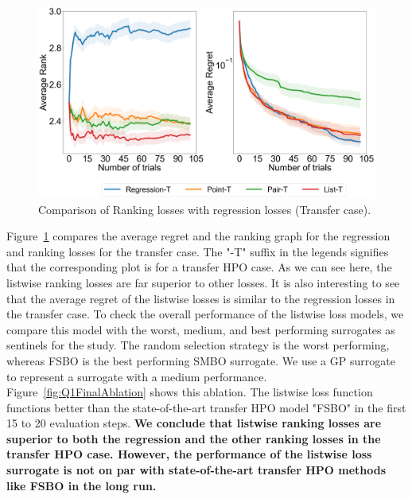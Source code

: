 \documentclass[12pt, twoside, ngerman]{report}
\begin{document}
\begin{figure}[h]
  \centering
    \includegraphics[scale=0.25]{images/Q1AblationTransfer}
    \caption{Comparison of Ranking losses with regression losses (Transfer case).}
    \label{fig:Q1AblationTransfer}
\end{figure}

Figure~\ref{fig:Q1AblationTransfer} compares the average regret and the ranking graph for the regression and ranking losses for the transfer case.
The "-T" suffix in the legends signifies that the corresponding plot is for a transfer HPO case.
As we can see here,  the listwise ranking losses are far superior to other losses.
It is also interesting to see that the average regret of the listwise losses is similar to the regression losses in the transfer case.
To check the overall performance of the listwise loss models, we compare this model with the worst,  medium, and best performing surrogates as sentinels for the study.
The random selection strategy is the worst performing,  whereas FSBO is the best performing SMBO surrogate. We use a GP surrogate to represent a surrogate with a medium performance.
Figure~\ref{fig:Q1FinalAblation} shows this ablation.
The listwise loss function functions better than the state-of-the-art transfer HPO model "FSBO" in the first 15 to 20 evaluation steps.
\textbf{We conclude that listwise ranking losses are superior to both the regression and the other ranking losses in the transfer HPO case.  However, the performance of the listwise loss surrogate is not on par with state-of-the-art transfer HPO methods like FSBO in the long run.}
\end{document}
